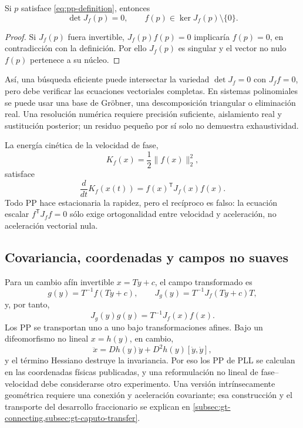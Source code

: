 \begin{proposition}
Si \(p\) satisface \cref{eq:pp-definition}, entonces
\begin{equation}
 \det J_f(p)=0,
 \qquad f(p)\in\ker J_f(p)\setminus\{0\}.
 \label{eq:pp-singular-screen}
\end{equation}
\end{proposition}

\begin{proof}
Si \(J_f(p)\) fuera invertible, \(J_f(p)f(p)=0\) implicaría \(f(p)=0\), en
contradicción con la definición. Por ello \(J_f(p)\) es singular y el vector
no nulo \(f(p)\) pertenece a su núcleo.
\end{proof}

Así, una búsqueda eficiente puede intersectar la variedad
\(\det J_f=0\) con \(J_f f=0\), pero debe verificar las ecuaciones vectoriales
completas. En sistemas polinomiales se puede usar una base de Gröbner,
una descomposición triangular o eliminación real. Una resolución numérica
requiere precisión suficiente, aislamiento real y sustitución posterior;
un residuo pequeño por sí solo no demuestra exhaustividad.

La energía cinética de la velocidad de fase,
\begin{equation}
 K_f(x)=\frac12\|f(x)\|_2^2,
\end{equation}
satisface
\begin{equation}
 \frac{d}{dt}K_f(x(t))=f(x)^{\mathsf T}J_f(x)f(x).
 \label{eq:pp-speed-derivative}
\end{equation}
Todo PP hace estacionaria la rapidez, pero el recíproco es falso: la ecuación
escalar \(f^{\mathsf T}J_f f=0\) sólo exige ortogonalidad entre velocidad y
aceleración, no aceleración vectorial nula.

\subsection{Covariancia, coordenadas y campos no suaves}

Para un cambio afín invertible \(x=Ty+c\), el campo transformado es
\begin{equation}
 g(y)=T^{-1}f(Ty+c),\qquad J_g(y)=T^{-1}J_f(Ty+c)T,
\end{equation}
y, por tanto,
\begin{equation}
 J_g(y)g(y)=T^{-1}J_f(x)f(x).
 \label{eq:pp-affine-covariance}
\end{equation}
Los PP se transportan uno a uno bajo transformaciones afines. Bajo un
difeomorfismo no lineal \(x=h(y)\), en cambio,
\begin{equation}
 \ddot x=Dh(y)\ddot y+D^2h(y)[\dot y,\dot y],
 \label{eq:pp-nonlinear-coordinate}
\end{equation}
y el término Hessiano destruye la invariancia. Por eso los PP de PLL se
calculan en las coordenadas físicas publicadas, y una reformulación no lineal
de fase--velocidad debe considerarse otro experimento. Una versión
intrínsecamente geométrica requiere una conexión y aceleración covariante;
esa construcción y el transporte del desarrollo fraccionario se explican en
\cref{subsec:gt-connecting,subsec:gt-caputo-transfer}.

